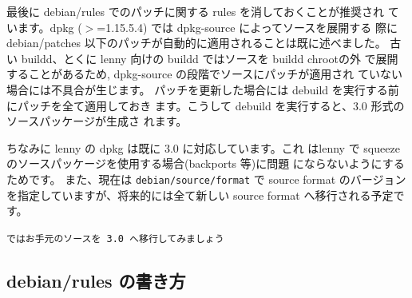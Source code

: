 \documentclass[mingoth,a4paper]{jsarticle}
\begin{document}
最後に debian/rules でのパッチに関する rules を消しておくことが推奨され
ています。dpkg ($>$=1.15.5.4) では dpkg-source によってソースを展開する
際にdebian/patches 以下のパッチが自動的に適用されることは既に述べました。
古い buildd、とくに lenny 向けの buildd ではソースを buildd chrootの外
で展開することがあるため, dpkg-source の段階でソースにパッチが適用され
ていない場合には不具合が生じます。
%
パッチを更新した場合には debuild を実行する前にパッチを全て適用しておき
ます。こうして debuild を実行すると、3.0 形式のソースパッケージが生成さ
れます。

ちなみに lenny の dpkg は既に 3.0 に対応しています。これ
はlenny で squeeze のソースパッケージを使用する場合(backports 等)に問題
にならないようにするためです。 また、現在は {\tt debian/source/format}
で source format のバージョンを指定していますが、将来的には全て新しい
source format へ移行される予定です。
\begin{center}
    {\tt ではお手元のソースを 3.0 へ移行してみましょう}    
\end{center}

\subsection{debian/rules の書き方}
\end{document}
